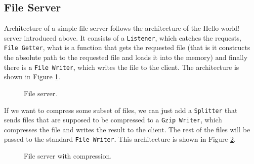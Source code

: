 \documentclass[12pt,a4paper]{article}
\begin{document}
\subsection{File Server}
\label{sec:fileServer}
Architecture of a simple file server follows the architecture of the Hello world!
server introduced above. It consists of a \texttt{Listener}, which catches the requests,
\texttt{File Getter}, what is a function that gets the requested file (that is it
constructs the absolute path to the requested file and loads it into the memory) 
and finally there is a \texttt{File Writer}, which
writes the file to the client. The architecture is shown in Figure \ref{fig:fileServer}.
\begin{figure}[h]
\centering
{}
\caption[scale=1.0]{File server.}
\label{fig:fileServer}
\end{figure}

If we want to compress some subset of files, we can just add a \texttt{Splitter}
that sends files that are supposed to be compressed to a \texttt{Gzip Writer}, which
compresses the file and writes the result to the client. The rest of the files
will be passed to the standard \texttt{File Writer}. This architecture is shown in
Figure \ref{fig:fileServer2}.

\begin{figure}[h]
\centering
{}
\caption[scale=1.0]{File server with compression.}
\label{fig:fileServer2}
\end{figure}
\end{document}

